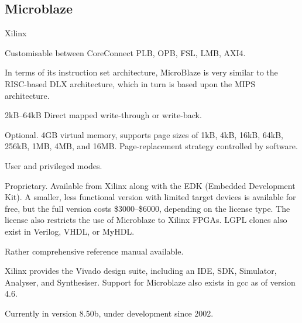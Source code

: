 \subsection{Microblaze}
\begin{description}[style=nextline]
\item[Developer] Xilinx
\item[Bus Used] Customisable between CoreConnect PLB, OPB, FSL, LMB, AXI4.
\item[Architecture] In terms of its instruction set architecture, MicroBlaze is very similar to the RISC-based DLX architecture, which in turn is based upon the MIPS architecture.
\item[Cache] 2kB--64kB Direct mapped write-through or write-back.
\item[MMU] Optional. 4GB virtual memory, supports page sizes of 1kB, 4kB, 16kB, 64kB, 256kB, 1MB, 4MB, and 16MB. Page-replacement strategy controlled by software.
\item[User Levels] User and privileged modes.
\item[License] Proprietary. Available from Xilinx along with the EDK (Embedded Development Kit). A smaller, less functional version with limited target devices is available for free, but the full version costs \$3000--\$6000, depending on the license type. The license also restricts the use of Microblaze to Xilinx FPGAs. LGPL clones also exist in Verilog, VHDL, or MyHDL.\cite{mb-clone}
\item[Documentation] Rather comprehensive reference manual available.\cite{mb-doc}
\item[Toolchain] Xilinx provides the Vivado design suite, including an IDE, SDK, Simulator, Analyser, and Synthesiser. Support for Microblaze also exists in gcc as of version 4.6.
\item[Maturity] Currently in version 8.50b, under development since 2002.
\end{description}

